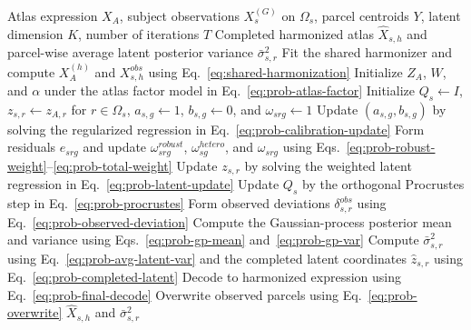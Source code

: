 \documentclass[11pt]{article}
\numberwithin{equation}{section}
\begin{document}
\begin{algorithm}[H]
\caption{Unified probabilistic alignment for subject $s$}
\begin{algorithmic}[1]
\Require Atlas expression $X_A$, subject observations $X_s^{(G)}$ on $\Omega_s$,
         parcel centroids $Y$, latent dimension $K$, number of iterations $T$
\Ensure Completed harmonized atlas $\hat{X}_{s,h}$ and parcel-wise average latent
        posterior variance $\bar{\sigma}_{s,r}^2$
\State Fit the shared harmonizer and compute $X_A^{(h)}$ and $X_{s,h}^{obs}$
       using Eq.~\eqref{eq:shared-harmonization}
\State Initialize $Z_A$, $W$, and $\alpha$ under the atlas factor model in
       Eq.~\eqref{eq:prob-atlas-factor}
\State Initialize $Q_s \gets I$, $z_{s,r} \gets z_{A,r}$ for $r\in\Omega_s$,
       $a_{s,g}\gets 1$, $b_{s,g}\gets 0$, and $\omega_{srg}\gets 1$
        \State Update $(a_{s,g},b_{s,g})$ by solving the regularized regression in
               Eq.~\eqref{eq:prob-calibration-update}
    \EndFor
        \State Form residuals $e_{srg}$ and update $\omega_{srg}^{robust}$,
               $\omega_{sg}^{hetero}$, and $\omega_{srg}$ using
               Eqs.~\eqref{eq:prob-robust-weight}--\eqref{eq:prob-total-weight}
        \State Update $z_{s,r}$ by solving the weighted latent regression in
               Eq.~\eqref{eq:prob-latent-update}
    \EndFor
    \State Update $Q_s$ by the orthogonal Procrustes step in
           Eq.~\eqref{eq:prob-procrustes}
\EndFor
\State Form observed deviations $\delta_{s,r}^{obs}$ using
       Eq.~\eqref{eq:prob-observed-deviation}
    \State Compute the Gaussian-process posterior mean and variance using
           Eqs.~\eqref{eq:prob-gp-mean} and~\eqref{eq:prob-gp-var}
\EndFor
\State Compute $\bar{\sigma}_{s,r}^{2}$ using Eq.~\eqref{eq:prob-avg-latent-var}
       and the completed latent coordinates $\hat{z}_{s,r}$ using
       Eq.~\eqref{eq:prob-completed-latent}
\State Decode to harmonized expression using Eq.~\eqref{eq:prob-final-decode}
\State Overwrite observed parcels using Eq.~\eqref{eq:prob-overwrite}
\State \Return $\hat{X}_{s,h}$ and $\bar{\sigma}_{s,r}^{2}$
\end{algorithmic}
\end{algorithm}
\end{document}
